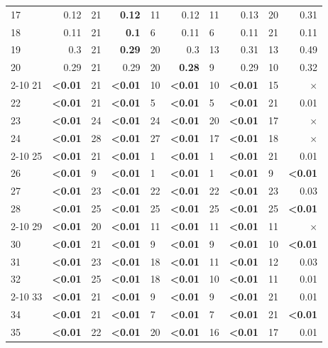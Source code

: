 \begin{longtable}{lr@{\hskip 4pt}l@{\hskip 12pt}r@{\hskip 4pt}l@{\hskip 12pt}r@{\hskip 4pt}l@{\hskip 12pt}r@{\hskip 4pt}l@{\hskip 12pt}r}
17 & 0.12 & 21 & \textbf{0.12} & 11 & 0.12 & 11 & 0.13 & 20 & 0.31 \\
18 & 0.11 & 21 & \textbf{0.1} & 6 & 0.11 & 6 & 0.11 & 21 & 0.11 \\
19 & 0.3 & 21 & \textbf{0.29} & 20 & 0.3 & 13 & 0.31 & 13 & 0.49 \\
20 & 0.29 & 21 & 0.29 & 20 & \textbf{0.28} & 9 & 0.29 & 10 & 0.32 \\
\cmidrule{2-10}
21 & \textbf{<0.01} & 21 & \textbf{<0.01} & 10 & \textbf{<0.01} & 10 & \textbf{<0.01} & 15 & $\times$ \\
22 & \textbf{<0.01} & 21 & \textbf{<0.01} & 5 & \textbf{<0.01} & 5 & \textbf{<0.01} & 21 & 0.01 \\
23 & \textbf{<0.01} & 24 & \textbf{<0.01} & 24 & \textbf{<0.01} & 20 & \textbf{<0.01} & 17 & $\times$ \\
24 & \textbf{<0.01} & 28 & \textbf{<0.01} & 27 & \textbf{<0.01} & 17 & \textbf{<0.01} & 18 & $\times$ \\
\cmidrule{2-10}
25 & \textbf{<0.01} & 21 & \textbf{<0.01} & 1 & \textbf{<0.01} & 1 & \textbf{<0.01} & 21 & 0.01 \\
26 & \textbf{<0.01} & 9 & \textbf{<0.01} & 1 & \textbf{<0.01} & 1 & \textbf{<0.01} & 9 & \textbf{<0.01} \\
27 & \textbf{<0.01} & 23 & \textbf{<0.01} & 22 & \textbf{<0.01} & 22 & \textbf{<0.01} & 23 & 0.03 \\
28 & \textbf{<0.01} & 25 & \textbf{<0.01} & 25 & \textbf{<0.01} & 25 & \textbf{<0.01} & 25 & \textbf{<0.01} \\
\cmidrule{2-10}
29 & \textbf{<0.01} & 20 & \textbf{<0.01} & 11 & \textbf{<0.01} & 11 & \textbf{<0.01} & 11 & $\times$ \\
30 & \textbf{<0.01} & 21 & \textbf{<0.01} & 9 & \textbf{<0.01} & 9 & \textbf{<0.01} & 10 & \textbf{<0.01} \\
31 & \textbf{<0.01} & 23 & \textbf{<0.01} & 18 & \textbf{<0.01} & 11 & \textbf{<0.01} & 12 & 0.03 \\
32 & \textbf{<0.01} & 25 & \textbf{<0.01} & 18 & \textbf{<0.01} & 10 & \textbf{<0.01} & 11 & 0.01 \\
\cmidrule{2-10}
33 & \textbf{<0.01} & 21 & \textbf{<0.01} & 9 & \textbf{<0.01} & 9 & \textbf{<0.01} & 21 & 0.01 \\
34 & \textbf{<0.01} & 21 & \textbf{<0.01} & 7 & \textbf{<0.01} & 7 & \textbf{<0.01} & 21 & \textbf{<0.01} \\
35 & \textbf{<0.01} & 22 & \textbf{<0.01} & 20 & \textbf{<0.01} & 16 & \textbf{<0.01} & 17 & 0.01 \\

\end{longtable}
